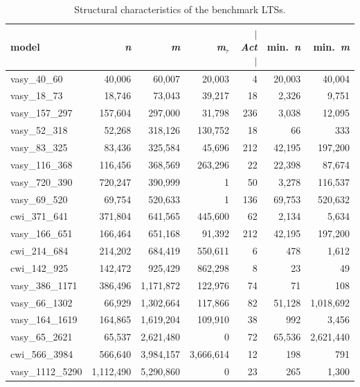\begin{table}[t]
\scriptsize
\centering
\caption{Structural characteristics of the benchmark LTSs.}
\begin{tabular}{lrrrrrr}
\hline
\textbf{model} & \textbf{\textit{n}} & \textbf{\textit{m}} & \textbf{\textit{m}}$_\tau$ &  \textbf{\textit{$\mid$Act$\mid$}} & \textbf{min.}\ \textbf{\textit{n}} & \textbf{min.}\ \textbf{\textit{m}} \\
\hline
\hline
vasy\_40\_60 & 40,006 & 60,007 & 20,003 & 4 & 20,003 & 40,004 \\ \hline
vasy\_18\_73 & 18,746 & 73,043 & 39,217 & 18 & 2,326 & 9,751 \\ \hline
vasy\_157\_297 & 157,604 & 297,000 & 31,798 & 236 & 3,038 & 12,095 \\ \hline
vasy\_52\_318 & 52,268 & 318,126 & 130,752 & 18 & 66 & 333 \\ \hline
vasy\_83\_325 & 83,436 & 325,584 & 45,696 & 212 & 42,195 & 197,200 \\ \hline
vasy\_116\_368 & 116,456 & 368,569 & 263,296 & 22 & 22,398 & 87,674 \\ \hline
vasy\_720\_390 & 720,247 & 390,999 & 1 & 50 & 3,278 & 116,537 \\ \hline
vasy\_69\_520 & 69,754 & 520,633 & 1 & 136 & 69,753 & 520,632 \\ \hline
cwi\_371\_641 & 371,804 & 641,565 & 445,600 & 62 & 2,134 & 5,634 \\ \hline
vasy\_166\_651 & 166,464 & 651,168 & 91,392 & 212 & 42,195 & 197,200 \\ \hline
cwi\_214\_684 & 214,202 & 684,419 & 550,611 & 6 & 478 & 1,612 \\ \hline
cwi\_142\_925 & 142,472 & 925,429 & 862,298 & 8 & 23 & 49 \\ \hline
vasy\_386\_1171 & 386,496 & 1,171,872 & 122,976 & 74 & 71 & 108 \\ \hline
vasy\_66\_1302 & 66,929 & 1,302,664 & 117,866 & 82 & 51,128 & 1,018,692 \\ \hline
vasy\_164\_1619 & 164,865 & 1,619,204 & 109,910 & 38 & 992 & 3,456 \\ \hline
vasy\_65\_2621 & 65,537 & 2,621,480 & 0 & 72 & 65,536 & 2,621,440 \\ \hline
cwi\_566\_3984 & 566,640 & 3,984,157 & 3,666,614 & 12 & 198 & 791 \\ \hline
vasy\_1112\_5290 & 1,112,490 & 5,290,860 & 0 & 23 & 265 & 1,300 \\ \hline

\end{tabular}
\end{table}
